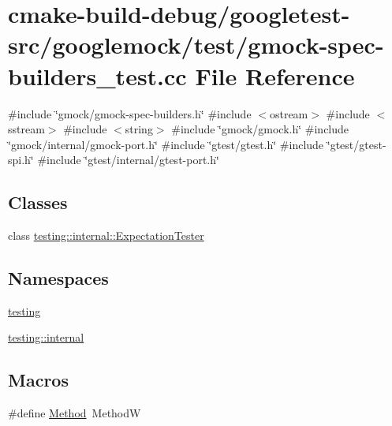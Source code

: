 \hypertarget{gmock-spec-builders__test_8cc}{}\section{cmake-\/build-\/debug/googletest-\/src/googlemock/test/gmock-\/spec-\/builders\+\_\+test.cc File Reference}
\label{gmock-spec-builders__test_8cc}
{\ttfamily \#include \char`\"{}gmock/gmock-\/spec-\/builders.\+h\char`\"{}}\newline
{\ttfamily \#include $<$ostream$>$}\newline
{\ttfamily \#include $<$sstream$>$}\newline
{\ttfamily \#include $<$string$>$}\newline
{\ttfamily \#include \char`\"{}gmock/gmock.\+h\char`\"{}}\newline
{\ttfamily \#include \char`\"{}gmock/internal/gmock-\/port.\+h\char`\"{}}\newline
{\ttfamily \#include \char`\"{}gtest/gtest.\+h\char`\"{}}\newline
{\ttfamily \#include \char`\"{}gtest/gtest-\/spi.\+h\char`\"{}}\newline
{\ttfamily \#include \char`\"{}gtest/internal/gtest-\/port.\+h\char`\"{}}\newline
\subsection*{Classes}
\begin{DoxyCompactItemize}
\item 
class \mbox{\hyperlink{classtesting_1_1internal_1_1ExpectationTester}{testing\+::internal\+::\+Expectation\+Tester}}
\end{DoxyCompactItemize}
\subsection*{Namespaces}
\begin{DoxyCompactItemize}
\item 
 \mbox{\hyperlink{namespacetesting}{testing}}
\item 
 \mbox{\hyperlink{namespacetesting_1_1internal}{testing\+::internal}}
\end{DoxyCompactItemize}
\subsection*{Macros}
\begin{DoxyCompactItemize}
\item 
\#define \mbox{\hyperlink{gmock-spec-builders__test_8cc_a95606368148f3e5aab5db46c32466afd}{Method}}~MethodW
\end{DoxyCompactItemize}

